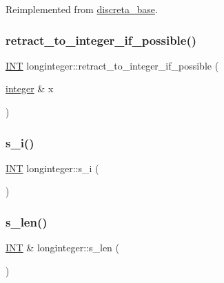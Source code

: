 Reimplemented from \mbox{\hyperlink{classdiscreta__base_a036e48bc058347046fc9b73dd0951478}{discreta\+\_\+base}}.

\mbox{\label{classlonginteger_a650d1f82c87e1f6a59a54a50e340394e}} 
\subsubsection{\texorpdfstring{retract\+\_\+to\+\_\+integer\+\_\+if\+\_\+possible()}{retract\_to\_integer\_if\_possible()}}
{\footnotesize\ttfamily \mbox{\hyperlink{galois_8h_a09fddde158a3a20bd2dcadb609de11dc}{I\+NT}} longinteger\+::retract\+\_\+to\+\_\+integer\+\_\+if\+\_\+possible (\begin{DoxyParamCaption}\item[{\mbox{\hyperlink{classinteger}{integer}} \&}]{x }\end{DoxyParamCaption})}

\mbox{\label{classlonginteger_aa0be3351b577305c0160b8bc8b4febde}} 
\subsubsection{\texorpdfstring{s\+\_\+i()}{s\_i()}}
{\footnotesize\ttfamily \mbox{\hyperlink{galois_8h_a09fddde158a3a20bd2dcadb609de11dc}{I\+NT}} longinteger\+::s\+\_\+i (\begin{DoxyParamCaption}{ }\end{DoxyParamCaption})}

\mbox{\label{classlonginteger_a5d414ae211f4e16abd932257351c74df}} 
\subsubsection{\texorpdfstring{s\+\_\+len()}{s\_len()}}
{\footnotesize\ttfamily \mbox{\hyperlink{galois_8h_a09fddde158a3a20bd2dcadb609de11dc}{I\+NT}} \& longinteger\+::s\+\_\+len (\begin{DoxyParamCaption}{ }\end{DoxyParamCaption})}

